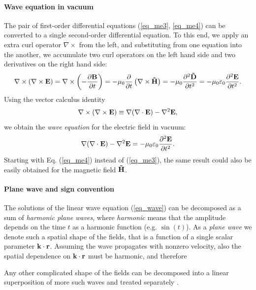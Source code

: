 \paragraph{Wave equation in vacuum} %
The pair of first-order differential equations (\ref{eq_me3}, \ref{eq_me4}) can be converted to a single second-order differential equation. To this end, we apply an extra curl operator $\nabla\times$ from the left, and substituting from one equation into the another, we accumulate two curl operators on the left hand side and two derivatives on the right hand side: 
\begin{equation} \nabla\times (\nabla\times \mathbf{E}) = \nabla\times \left(- \frac{\partial \mathbf{B}} {\partial t}\right) = -\mu_0 \frac{\partial}{\partial t} \left(\nabla\times \mathbf{\tilde{H}}\right) 
= -\mu_0 \frac{\partial^{2} \mathbf{\tilde{D}}}{\partial t^{2}} = -\mu_0 \varepsilon_0 \frac{\partial^{2} \mathbf{E}}{\partial t^{2}}.  \label{eq_elim}\end{equation}
Using the vector calculus identity
\begin{equation} \nabla\times (\nabla\times \mathbf{E}) \equiv \nabla (\nabla \cdot \mathbf{E}) - \nabla^2 \mathbf{E}, \label{eq_rotrot}\end{equation}
we obtain the \textit{wave equation} for the electric field in vacuum: 
\begin{equation}  \nabla (\nabla \cdot \mathbf{E}) - \nabla^2 \mathbf{E} = -\mu_0 \varepsilon_0 \frac{\partial^{2} \mathbf{E}}{\partial t^{2}}.  \label{eq_wave}\end{equation}
Starting with Eq. (\ref{eq_me4}) instead of (\ref{eq_me3}), the same result could also be easily obtained for the magnetic field $\mathbf{\tilde{H}}$.
\paragraph{Plane wave and sign convention} %
The solutions of the linear wave equation (\ref{eq_wave}) can be decomposed as a sum of \textit{harmonic plane waves}, where \textit{harmonic} means that the amplitude depends on the time $t$ as a harmonic function (e.g. $\sin(t)$). As a \textit{plane wave} we denote such a spatial shape of the fields, that is a function of a single  scalar parameter ${\mathbf{k}}\cdot{\mathbf{r}}$. Assuming the wave propagates with nonzero velocity, also the spatial dependence on  ${\mathbf{k}}\cdot{\mathbf{r}}$ must be harmonic, and therefore 

Any other complicated shape of the fields can be decomposed into a linear superposition of more such waves and treated separately \cite{jackson1962book}. 

